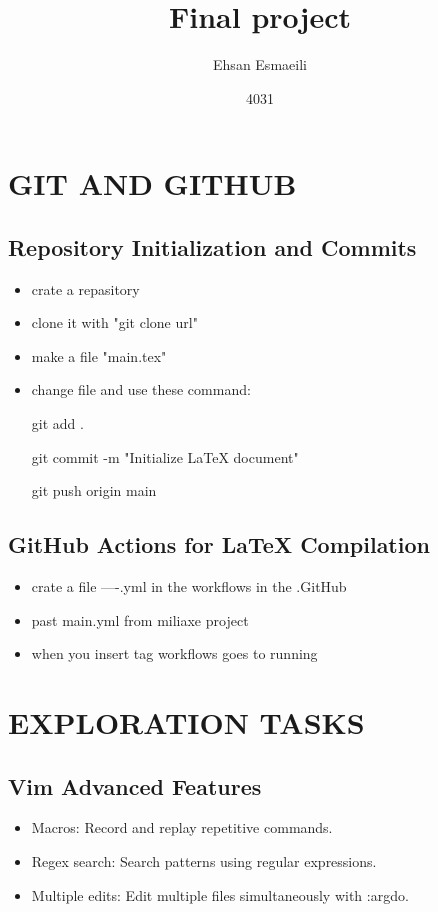 \documentclass{article}
\title{Final project}
\date{4031}
\author{Ehsan Esmaeili}
\begin{document}
\maketitle
\newpage

\tableofcontents

\newpage

\section{GIT AND GITHUB}

\subsection{Repository Initialization and Commits}
\begin{itemize}
   

 \item crate a repasitory

 \item clone it with "git clone url"

 \item make a file "main.tex"

 \item change file and use these command:

  git add .

  git commit -m "Initialize LaTeX document"

  git push origin main
\end{itemize}
\subsection{GitHub Actions for LaTeX Compilation}

\begin{itemize}

\item crate a file ----.yml in the workflows in the .GitHub

\item past main.yml from miliaxe project

\item when you insert tag workflows goes to running
\end{itemize}
\newpage

\section{EXPLORATION TASKS}

\subsection{Vim Advanced Features}
\begin{itemize}

\item Macros: Record and replay repetitive commands. 

\item Regex search: Search patterns using regular expressions.

\item Multiple edits: Edit multiple files simultaneously with :argdo.
\end{itemize}
\end{document}
